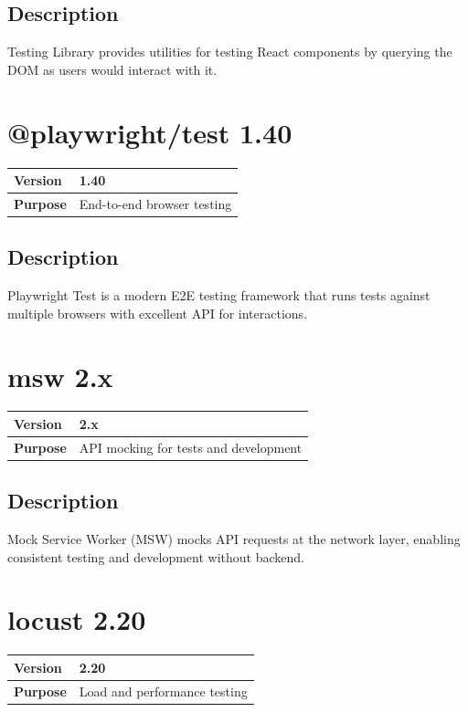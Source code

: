 \documentclass[12pt,a4paper]{report}
\begin{document}
\subsection{Description}

Testing Library provides utilities for testing React components by querying the DOM as users would interact with it.

\section{@playwright/test 1.40}

\begin{tabular}{|p{4cm}|p{10cm}|}
\hline
\textbf{Version} & 1.40 \\
\hline
\textbf{Purpose} & End-to-end browser testing \\
\hline
\end{tabular}

\subsection{Description}

Playwright Test is a modern E2E testing framework that runs tests against multiple browsers with excellent API for interactions.

\section{msw 2.x}

\begin{tabular}{|p{4cm}|p{10cm}|}
\hline
\textbf{Version} & 2.x \\
\hline
\textbf{Purpose} & API mocking for tests and development \\
\hline
\end{tabular}

\subsection{Description}

Mock Service Worker (MSW) mocks API requests at the network layer, enabling consistent testing and development without backend.

\section{locust 2.20}

\begin{tabular}{|p{4cm}|p{10cm}|}
\hline
\textbf{Version} & 2.20 \\
\hline
\textbf{Purpose} & Load and performance testing \\
\hline
\end{tabular}
\end{document}
